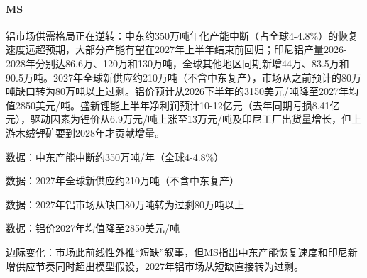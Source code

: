 \documentclass[11pt]{ctexart}
\begin{document}
\paragraph{MS} 铝市场供需格局正在逆转：中东约350万吨年化产能中断（占全球4-4.8\%）的恢复速度远超预期，大部分产能有望在2027年上半年结束前回归；印尼铝产量2026-2028年分别达86.6万、120万和130万吨，全球其他地区同期新增44万、83.5万和90.5万吨。2027年全球新供应约210万吨（不含中东复产），市场从之前预计的80万吨缺口转为80万吨以上过剩。铝价预计从2026下半年的3150美元/吨降至2027年均值2850美元/吨。盛新锂能上半年净利润预计10-12亿元（去年同期亏损8.41亿元），驱动因素为锂价从6.9万元/吨上涨至13万元/吨及印尼工厂出货量增长，但上游木绒锂矿要到2028年才贡献增量。
{\small\color{refgray}数据：中东产能中断约350万吨/年（全球4-4.8\%）\par}
{\small\color{refgray}数据：2027年全球新供应约210万吨（不含中东复产）\par}
{\small\color{refgray}数据：2027年铝市场从缺口80万吨转为过剩80万吨以上\par}
{\small\color{refgray}数据：铝价2027年均值降至2850美元/吨\par}
{\small\color{refgray}边际变化：市场此前线性外推“短缺”叙事，但MS指出中东产能恢复速度和印尼新增供应节奏同时超出模型假设，2027年铝市场从短缺直接转为过剩。\par}
\end{document}
